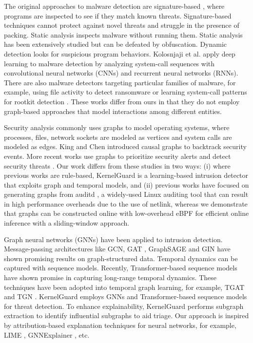 \documentclass[conference]{IEEEtran}
\begin{document}
The original approaches to malware detection are signature-based \cite{clamav2020}, where programs are inspected to see if they match known threats. Signature-based techniques cannot protect against novel threats and struggle in the presence of packing. Static analysis inspects malware without running them. Static analysis has been extensively studied but can be defeated by obfuscation. Dynamic detection looks for suspicious program behaviors. Kolosnjaji et al. \cite{kolosnjaji2016deep} apply deep learning to malware detection by analyzing system-call sequences with convolutional neural networks (CNNs) and recurrent neural networks (RNNs). There are also malware detectors targeting particular families of malware, for example, using file activity to detect ransomware \cite{scaife2016cryptolock,continella2016shieldfs} or learning system-call patterns for rootkit detection \cite{nguyen2021rootkit}. These works differ from ours in that they do not employ graph-based approaches that model interactions among different entities.

Security analysis commonly uses graphs to model operating systems, where processes, files, network sockets are modeled as vertices and system calls are modeled as edges. King and Chen \cite{king2003backtracking} introduced causal graphs to backtrack security events. More recent works use graphs to prioritize security alerts \cite{milajerdi2019holmes,han2020unicorn} and detect security threats \cite{wang2022provenance,cheng2023kairos,yang2023prographer}. Our work differs from these studies in two ways: (i) where previous works are rule-based, KernelGuard is a learning-based intrusion detector that exploits graph and temporal models, and (ii) previous works have focused on generating graphs from auditd \cite{auditd2018}, a widely-used Linux auditing tool that can result in high performance overheads due to the use of netlink, whereas we demonstrate that graphs can be constructed online with low-overhead eBPF for efficient online inference with a sliding-window approach.

Graph neural networks (GNNs) have been applied to intrusion detection. Message-passing architectures like GCN, GAT \cite{velickovic2018gat}, GraphSAGE \cite{hamilton2017graphsage} and GIN \cite{xu2019powerful} have shown promising results on graph-structured data. Temporal dynamics can be captured with sequence models. Recently, Transformer-based sequence models \cite{vaswani2017attention} have shown promise in capturing long-range temporal dynamics. These techniques have been adopted into temporal graph learning, for example, TGAT \cite{xu2020tgat} and TGN \cite{rossi2020tgn}. KernelGuard employs GNNs and Transformer-based sequence models for threat detection. To enhance explainability, KernelGuard performs subgraph extraction to identify influential subgraphs to aid triage. Our approach is inspired by attribution-based explanation techniques for neural networks, for example, LIME \cite{ribeiro2016lime}, GNNExplainer \cite{ying2019gnnexplainer}, etc.
\end{document}
